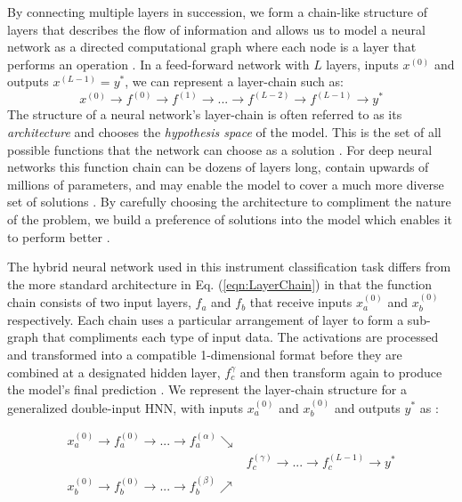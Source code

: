 \documentclass[conference,onecolumn,letterpaper]{IEEEtran}
\begin{document}
By connecting multiple layers in succession, we form a chain-like structure of layers that describes the flow of information and allows us to model a neural network as a directed computational graph where each node is a layer that performs an operation  \cite{Geron,Goodfellow}. In a feed-forward network with $L$ layers, inputs $x^{(0)}$ and outputs $x^{(L-1)} = y^*$, we can represent a layer-chain such as:
\begin{equation}
    \label{eqn:LayerChain}
    x^{(0)} \rightarrow f^{(0)} \rightarrow f^{(1)} \rightarrow ... \rightarrow f^{(L-2)} \rightarrow f^{(L-1)} \rightarrow y^*
\end{equation}
The structure of a neural network's layer-chain is often referred to as its \textit{architecture} and chooses the \textit{hypothesis space} of the model. This is the set of all possible functions that the network can choose as a solution \cite{Goodfellow,James}. For deep neural networks this function chain can be dozens of layers long, contain upwards of millions of parameters, and may enable the model to cover a much more diverse set of solutions \cite{Geron}. By carefully choosing the architecture to compliment the nature of the problem, we build a preference of solutions into the model which enables it to perform better \cite{Goodfellow}.

The hybrid neural network used in this instrument classification task differs from the more standard architecture in Eq. (\ref{eqn:LayerChain}) in that the function chain consists of two input layers, $f_a$ and $f_b$ that receive inputs $x^{(0)}_a$ and $x^{(0)}_b$ respectively. Each chain uses a particular arrangement of layer to form a sub-graph that compliments each type of input data. The activations are processed and transformed into a compatible 1-dimensional format before they are combined at a designated hidden layer, $f_c^{\gamma}$ and then transform again to produce the model's final prediction . We represent the layer-chain structure for a generalized double-input HNN, with inputs $x^{(0)}_a$ and $x^{(0)}_b$ and outputs $y^*$ as :

\begin{equation}
    \label{eqn:LayerGraph}
    \begin{split}
        x^{(0)}_a \rightarrow f^{(0)}_a \rightarrow  ... \rightarrow f^{(\alpha)}_a \searrow &\\
                & f^{(\gamma)}_c \rightarrow ... \rightarrow f^{(L-1)}_c \rightarrow y^* \\
        x^{(0)}_b \rightarrow f^{(0)}_b \rightarrow  ... \rightarrow f^{(\beta)}_b \nearrow &\\
    \end{split}
\end{equation}
\end{document}
